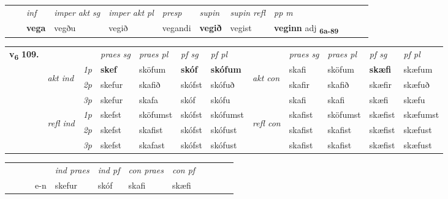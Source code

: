 \begin{tabular}{llllllllllll}
 & & \textit{inf} & \textit{imper akt sg} & \textit{imper akt pl}   & \textit{presp} & \textit{supin} & \textit{supin refl} & \textit{pp m}     \\*
  & & \textbf{vega} & vegðu  & vegið   & vegandi &  \textbf{vegið} & vegist & \textbf{veginn} adj \textbf{\textsubscript{6a-89}} \\*
\cmidrule{1-12}
\end{tabular}



\begin{tabular}{llllllllllll} \toprule
\multirow{4}{*}{{{\textbf{v{\textsubscript{6}}} \Large{\textbf{109.}}}}}  & &   &  \textit{praes sg}  & \textit{praes pl}  &\textit{ pf sg} & \textit{pf pl} &  &  \textit{praes sg}  & \textit{praes pl}  & \textit{pf sg} & \textit{pf pl } \\*
	\cmidrule{4-7} \cmidrule{9-12}
 & \multirow{3}{*}{\begin{turn}{90}\textit{akt ind}\end{turn}} & {\textit{1p}} & \textbf{skef} & sköfum    & \textbf{skóf} & \textbf{skófum} & \multirow{3}{*}{\begin{turn}{90}\textit{akt con}\end{turn}} &skafi & sköfum & \textbf{skæfi} & skæfum\\*
& &  {\textit{2p}} &  skefur  & skafið   & skófst & skófuð & & skafir & skafið & skæfir & skæfuð \\*
& &  {\textit{3p}} & skefur & skafa   & skóf & skófu & & skafi & skafi& skæfi & skæfu  \\*
\cmidrule{4-7} \cmidrule{9-12}
 &\multirow{3}{*}{\begin{turn}{90}\textit{refl ind}\end{turn}} & {\textit{1p}} & skefst & sköfumst    & skófst & skófumst & \multirow{3}{*}{\begin{turn}{90}\textit{refl con}\end{turn}}  &skafist & sköfumst & skæfist & skæfumst\\*
 &&  {\textit{2p}} &  skefst  & skafist   & skófst & skófust & &skafist & skafist & skæfist & skæfust \\*
& &  {\textit{3p}} & skefst & skafast   & skófst & skófust & & skafist & skafist& skæfist & skæfust  \\*
\cmidrule{4-7} \cmidrule{9-12}
\end{tabular}


\begin{tabular}{llllllllllll}
 & &  & &  \textit{ind praes} & \textit{ind pf} & \textit{con praes} & \textit{con pf} \\*
&  & & e-n & skefur & skóf & skafi & skæfi \\*
\cmidrule{5-9}
\end{tabular}


